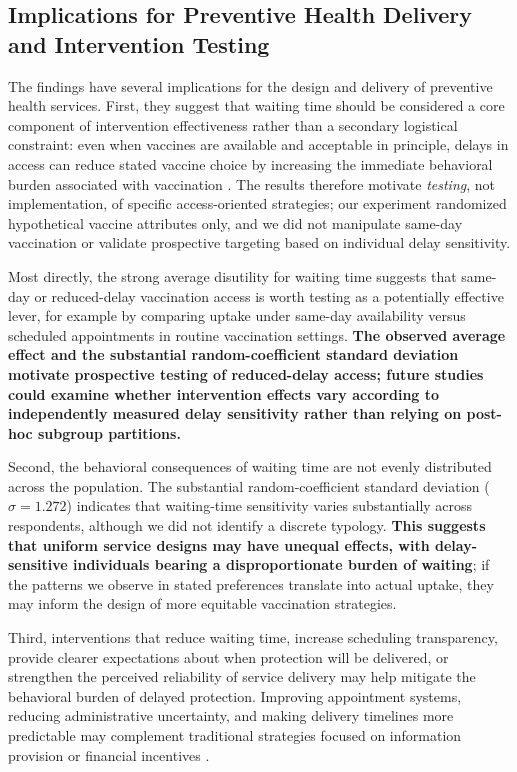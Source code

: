 \documentclass[12pt]{article}
\begin{document}
\subsection{Implications for Preventive Health Delivery and Intervention Testing}

The findings have several implications for the design and delivery of preventive health services. First, they suggest that waiting time should be considered a core component of intervention effectiveness rather than a secondary logistical constraint: even when vaccines are available and acceptable in principle, delays in access can reduce stated vaccine choice by increasing the immediate behavioral burden associated with vaccination \parencite{BrewerEtAl2017,LiuEtAl2024}. The results therefore motivate \textit{testing}, not implementation, of specific access-oriented strategies; our experiment randomized hypothetical vaccine attributes only, and we did not manipulate same-day vaccination or validate prospective targeting based on individual delay sensitivity.

Most directly, the strong average disutility for waiting time suggests that same-day or reduced-delay vaccination access is worth testing as a potentially effective lever, for example by comparing uptake under same-day availability versus scheduled appointments in routine vaccination settings. \textbf{The observed average effect and the substantial random-coefficient standard deviation motivate prospective testing of reduced-delay access; future studies could examine whether intervention effects vary according to independently measured delay sensitivity rather than relying on post-hoc subgroup partitions.}

Second, the behavioral consequences of waiting time are not evenly distributed across the population. The substantial random-coefficient standard deviation ($\sigma = 1.272$) indicates that waiting-time sensitivity varies substantially across respondents, although we did not identify a discrete typology. \textbf{This suggests that uniform service designs may have unequal effects, with delay-sensitive individuals bearing a disproportionate burden of waiting}; if the patterns we observe in stated preferences translate into actual uptake, they may inform the design of more equitable vaccination strategies.

Third, interventions that reduce waiting time, increase scheduling transparency, provide clearer expectations about when protection will be delivered, or strengthen the perceived reliability of service delivery may help mitigate the behavioral burden of delayed protection. Improving appointment systems, reducing administrative uncertainty, and making delivery timelines more predictable may complement traditional strategies focused on information provision or financial incentives \parencite{BrewerEtAl2017,LiuEtAl2024}.
\end{document}
